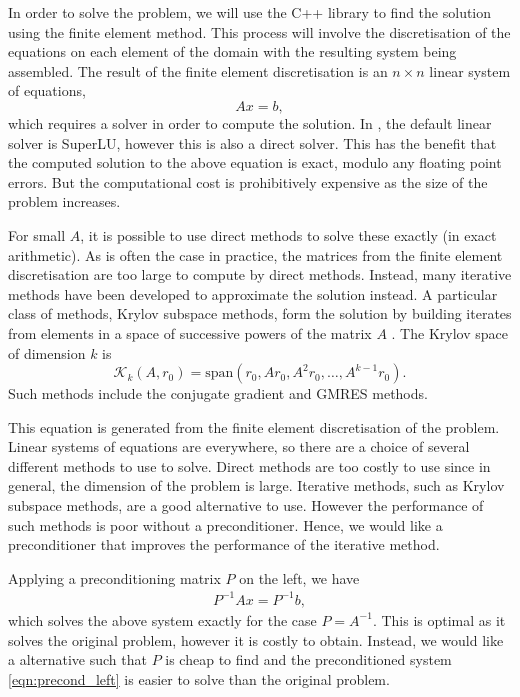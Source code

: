 
\iffalse
	Discretise
	Direct vs Iterative solver (Krylov subspace)
	Multigrid
	Preconditioners
	CSLP
	MG as a preconditioner
\fi

In order to solve the problem, we will use the C++ library \oomph to find the solution using the finite element method.
This process will involve the discretisation of the equations on each element of the domain with the resulting system being assembled.
The result of the finite element discretisation is an $n\times n$ linear system of equations,
\[
	A x = b,
\]
which requires a solver in order to compute the solution.
In \oomph, the default linear solver is SuperLU, however this is also a direct solver.
This has the benefit that the computed solution to the above equation is exact, modulo any floating point errors.
But the computational cost is prohibitively expensive as the size of the problem increases.

For small $A$, it is possible to use direct methods to solve these exactly (in exact arithmetic).
As is often the case in practice, the matrices from the finite element discretisation are too large to compute by direct methods.
Instead, many iterative methods have been developed to approximate the solution instead.
A particular class of methods, Krylov subspace methods, form the solution by building iterates from elements in a space  of successive powers of the matrix $A$ \cite{leveque}.
The Krylov space of dimension $k$ is 
\[
	\mathcal{K}_k(A, r_0) = \mathrm{span}(r_0, Ar_0, A^2 r_0, \ldots, A^{k-1} r_0).
\]
Such methods include the conjugate gradient and GMRES methods.

This equation is generated from the finite element discretisation of the problem.
Linear systems of equations are everywhere, so there are a choice of several different methods to use to solve.
Direct methods are too costly to use since in general, the dimension of the problem is large.
Iterative methods, such as Krylov subspace methods, are a good alternative to use.
However the performance of such methods is poor without a preconditioner.
Hence, we would like a preconditioner that improves the performance of the iterative method.

Applying a preconditioning matrix $P$ on the left, we have
\begin{align}
	P^{-1} A x = P^{-1} b, \label{eqn:precond_left}
\end{align}
which solves the above system exactly for the case $P=A^{-1}$. 
This is optimal as it solves the original problem, however it is costly to obtain.
Instead, we would like a alternative such that $P$ is cheap to find and the preconditioned system \eqref{eqn:precond_left} is easier to solve than the original problem.

